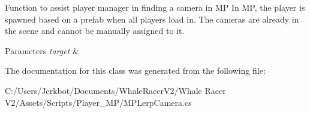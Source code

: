 Function to assist player manager in finding a camera in MP In MP, the player is spawned based on a prefab when all players load in. The cameras are already in the scene and cannot be manually assigned to it. 


\begin{DoxyParams}{Parameters}
{\em target} & \\
\hline
\end{DoxyParams}


The documentation for this class was generated from the following file\+:\begin{DoxyCompactItemize}
\item 
C\+:/\+Users/\+Jerkbot/\+Documents/\+Whale\+Racer\+V2/\+Whale Racer V2/\+Assets/\+Scripts/\+Player\+\_\+\+M\+P/M\+P\+Lerp\+Camera.\+cs\end{DoxyCompactItemize}
